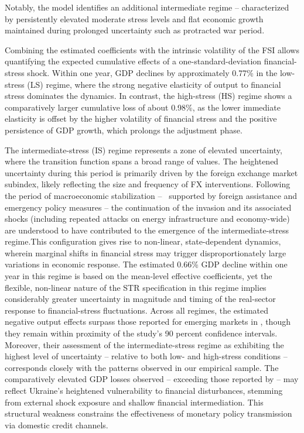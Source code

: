 \documentclass[12pt,preprint,aps,author-year]{revtex4-1}
\begin{document}
Notably, the model identifies an additional intermediate regime – characterized by persistently elevated moderate stress levels and flat economic growth maintained during prolonged uncertainty such as protracted war period.

Combining the estimated coefficients with the intrinsic volatility of the FSI allows quantifying the expected cumulative effects of a one-standard-deviation financial-stress shock. Within one year, GDP declines by approximately 0.77\% in the low-stress (LS) regime, where the strong negative elasticity of output to financial stress dominates the dynamics. In contrast, the high-stress (HS) regime shows a comparatively larger cumulative loss of about 0.98\%, as the lower immediate elasticity is offset by the higher volatility of financial stress and the positive persistence of GDP growth, which prolongs the adjustment phase.

The intermediate-stress (IS) regime represents a zone of elevated uncertainty, where the transition function spans a broad range of values. The heightened uncertainty during this period is primarily driven by the foreign exchange market subindex, likely reflecting the size and frequency of FX interventions. Following the period of macroeconomic stabilization –  supported by foreign assistance and emergency policy measures – the continuation of the invasion and its associated shocks (including repeated attacks on energy infrastructure and economy-wide) are understood to have contributed to the emergence of the intermediate-stress regime.This configuration gives rise to non-linear, state-dependent dynamics, wherein marginal shifts in financial stress may trigger disproportionately large variations in economic response. The estimated 0.66\% GDP decline within one year in this regime is based on the mean-level effective coefficients, yet the flexible, non-linear nature of the STR specification in this regime implies considerably greater uncertainty in magnitude and timing of the real-sector response to financial-stress fluctuations. Across all regimes, the estimated negative output effects surpass those reported for emerging markets in \cite{ahir2023}, though they remain within proximity of the study’s 90 percent confidence intervals. Moreover, their assessment of the intermediate-stress regime as exhibiting the highest level of uncertainty – relative to both low- and high-stress conditions – corresponds closely with the patterns observed in our empirical sample. The comparatively elevated GDP losses observed – exceeding those reported by \cite{ahir2023} – may reflect Ukraine’s heightened vulnerability to financial disturbances, stemming from external shock exposure and shallow financial intermediation. This structural weakness constrains the effectiveness of monetary policy transmission via domestic credit channels.
\end{document}
